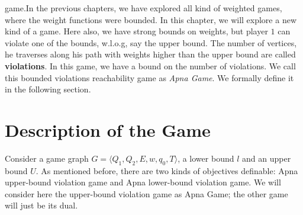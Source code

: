  game.In the previous chapters, we have explored all kind of weighted games, where the weight functions were bounded. In this chapter, we will explore a new kind of a game. Here also, we have strong bounds on weights, but player $1$ can violate one of the bounds, w.l.o.g, say the upper bound. The number of vertices, he traverses along his path with weights higher than the upper bound are called \textbf{violations}. In this game, we have a bound on the number of violations. We call this bounded violations reachability game as \textit{Apna Game}. We formally define it in the following section.\\

\section{Description of the Game}
Consider a game graph $G=\langle Q_1, Q_2, E, w, q_0, T \rangle$, a lower bound $l$ and an upper bound $U$. As mentioned before, there are two kinds of objectives definable: Apna upper-bound violation game and Apna lower-bound violation game. We will consider here the upper-bound violation game as Apna Game; the other game will just be its dual.